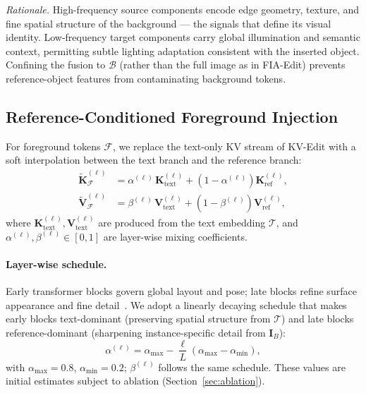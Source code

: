\textit{Rationale.}
High-frequency source components encode edge geometry, texture, and fine spatial structure
of the background — the signals that define its visual identity.
Low-frequency target components carry global illumination and semantic context, permitting
subtle lighting adaptation consistent with the inserted object.
Confining the fusion to $\mathcal{B}$ (rather than the full image as in FIA-Edit) prevents
reference-object features from contaminating background tokens.

\subsection{Reference-Conditioned Foreground Injection}

For foreground tokens $\mathcal{F}$, we replace the text-only KV stream of KV-Edit
with a soft interpolation between the text branch and the reference branch:
\begin{align}
    \tilde{\mathbf{K}}_{\mathcal{F}}^{(\ell)}
        &= \alpha^{(\ell)}\,\mathbf{K}_{\mathrm{text}}^{(\ell)}
         + \left(1 - \alpha^{(\ell)}\right)\mathbf{K}_{\mathrm{ref}}^{(\ell)},
    \label{eq:fg_K} \\
    \tilde{\mathbf{V}}_{\mathcal{F}}^{(\ell)}
        &= \beta^{(\ell)}\,\mathbf{V}_{\mathrm{text}}^{(\ell)}
         + \left(1 - \beta^{(\ell)}\right)\mathbf{V}_{\mathrm{ref}}^{(\ell)},
    \label{eq:fg_V}
\end{align}
where $\mathbf{K}_{\mathrm{text}}^{(\ell)}, \mathbf{V}_{\mathrm{text}}^{(\ell)}$ are
produced from the text embedding $\mathcal{T}$, and
$\alpha^{(\ell)}, \beta^{(\ell)} \in [0,1]$ are layer-wise mixing coefficients.

\paragraph{Layer-wise schedule.}
Early transformer blocks govern global layout and pose; late blocks refine surface
appearance and fine detail~\cite{yang2026fia}.
We adopt a linearly decaying schedule that makes early blocks text-dominant
(preserving spatial structure from $\mathcal{T}$) and late blocks reference-dominant
(sharpening instance-specific detail from $\mathbf{I}_B$):
\begin{equation}
    \alpha^{(\ell)}
        = \alpha_{\max} - \frac{\ell}{L}\left(\alpha_{\max} - \alpha_{\min}\right),
    \label{eq:schedule}
\end{equation}
with $\alpha_{\max} = 0.8$, $\alpha_{\min} = 0.2$; $\beta^{(\ell)}$ follows the same
schedule.
These values are initial estimates subject to ablation (Section~\ref{sec:ablation}).

